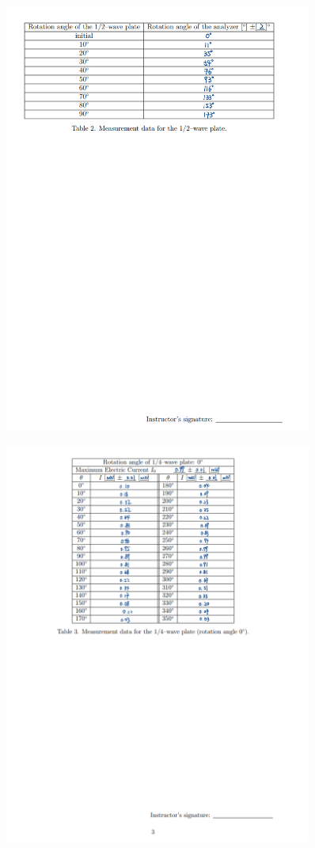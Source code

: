 \documentclass[12pt, a4paper, oneside]{article}
\begin{document}
\begin{figure}
	\centering
	\includegraphics[width=0.9\textwidth]{D2.png}
	\label{fig9}
\end{figure}

\begin{figure}
	\centering
	\includegraphics[width=0.9\textwidth]{D3.png}
	\label{fig10}
\end{figure}
\end{document}
